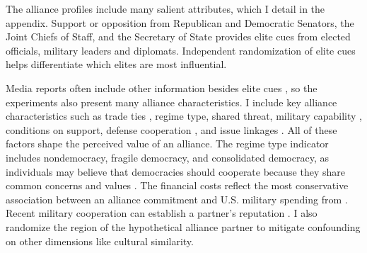 \documentclass[12pt]{article}
\begin{document}
%                    
%                                                                            


The alliance profiles include many salient attributes, which I detail in the appendix. 
Support or opposition from Republican and Democratic Senators, the Joint Chiefs of Staff, and the Secretary of State provides elite cues from elected officials, military leaders and diplomats. 
Independent randomization of elite cues helps differentiate which elites are most influential.


Media reports often include other information besides elite cues \citep{BaumPotter2008}, so the experiments also present many alliance characteristics. 
I include key alliance characteristics such as trade ties \citep{Fordham2010}, regime type, shared threat, military capability \citep{Johnsonetal2015}, conditions on support, defense cooperation \citep{Morrow1994, LeedsAnac2005}, and issue linkages \citep{Poast2012}.
All of these factors shape the perceived value of an alliance. 
The regime type indicator includes nondemocracy, fragile democracy, and consolidated democracy, as individuals may believe that democracies should cooperate because they share common concerns and values \citep{Chuetal2021}. 
The financial costs reflect the most conservative association between an alliance commitment and U.S. military spending from \citet{AlleyFuhrmann2021}. 
Recent military cooperation can establish a partner's reputation \citep{Crescenzietal2012, GannonKent2020}.
I also randomize the region of the hypothetical alliance partner to mitigate confounding on other dimensions like cultural similarity.
\end{document}
